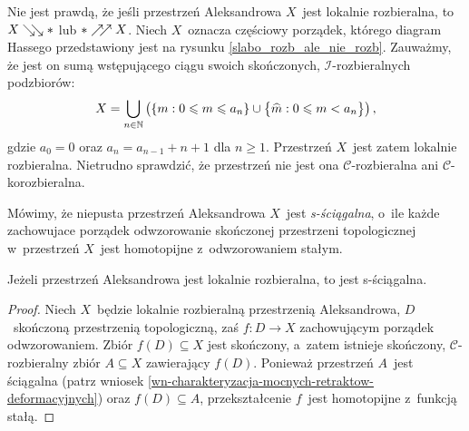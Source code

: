 \begin{ex}\label{ex-slabo_rozb_ale_nie_rozb}
Nie jest prawdą, że jeśli przestrzeń Aleksandrowa $X$~jest lokalnie rozbieralna, to $X\searrow\!\!\searrow *$ lub $*\nearrow\!\!\nearrow X$. Niech $X$~oznacza częściowy porządek, którego diagram Hassego przedstawiony jest na rysunku \ref{slabo_rozb_ale_nie_rozb}. Zauważmy, że jest on sumą wstępującego ciągu swoich skończonych, $\mathcal{I}$-rozbieralnych podzbiorów:
\[X=\bigcup_{n\in\mathbb{N}} \left(\left\{m:0\leqslant m\leqslant a_n\right\}\cup \bigl\{\widehat{m}:0\leqslant m< a_n\bigr\}\right),\]
gdzie $a_0=0$ oraz $a_n=a_{n-1}+n+1$ dla $n\geq 1$. Przestrzeń $X$~jest zatem lokalnie rozbieralna. Nietrudno sprawdzić, że przestrzeń nie jest ona $\mathcal{C}$-rozbieralna ani $\mathcal{C}$-korozbieralna.
\end{ex}

\begin{comment}\begin{lem}\label{lem-retrakcje_zachowuja_slaba_rozbieralnosc}
Jeżeli przestrzeń Aleksandrowa~jest lokalnie rozbieralna, to każdy jej retrakt jest również lokalnie rozbieralny.
\end{lem}
\begin{proof}
Niech $X$~będzie lokalnie rozbieralną przestrzenią Aleksandrowa, zaś $r\colon X\to A$ zachowującą porządek retrakcją. Ustalmy skończony zbiór $D\subseteq A$. Ponieważ $A\subseteq X$, zbiór $D\subseteq X$. Istnieje zatem skończony, $\mathcal{I}$-rozbieralny zbiór $E\subseteq X$ zawierający $D$; niech $\left(r_i\colon E_i\to E_{i+1}\right)_{i=1}^{n}$ będzie, dla pewnej liczby $n\in\mN$, ciągiem $\mathcal{I}$-rozbierającym $E$~do punktu. Zbiór $r(E)$ jest skończony, zawiera $D$, a~$\bigl((r\circ r_i)\colon r(E_i)\to r(E_{i+1})\bigr)_{i=1}^{n}$ jest ciągiem $\mathcal{C}$-rozbierającym ten zbiór do punktu.
DOWÓD ZŁY. ALE Z INNYCH PRZYCZYN TAK CHYBA JEST - BO RETRAKT SKONCZONEGO ROZBIERALNEGO JEST ROZBIERALNY
\end{proof}
\end{comment}

Mówimy, że niepusta przestrzeń Aleksandrowa $X$~jest \mbox{\textit{s-ściągalna}}, o~ile każde zachowujace porządek odwzorowanie skończonej przestrzeni topologicznej w~przestrzeń $X$~jest homotopijne z~odwzorowaniem stałym. 

\begin{lem}\label{lem-lok_rozb_to_s-sciagalna}
Jeżeli przestrzeń Aleksandrowa jest lokalnie rozbieralna, to jest \mbox{s-ściągalna}.
\end{lem}
\begin{proof}
Niech $X$~będzie lokalnie rozbieralną przestrzenią Aleksandrowa, $D$~skończoną przestrzenią topologiczną, zaś $f\colon D\to X$ zachowującym porządek odwzorowaniem. Zbiór $f(D)\subseteq X$ jest skończony, a~zatem istnieje skończony, \mbox{$\mathcal{C}$-rozbieralny} zbiór $A\subseteq X$ zawierający $f(D)$. Ponieważ przestrzeń $A$~jest ściągalna (patrz wniosek \ref{wn-charakteryzacja-mocnych-retraktow-deformacyjnych}) oraz $f(D)\subseteq A$, przekształcenie $f$~jest homotopijne z~funkcją stałą.
\end{proof}

